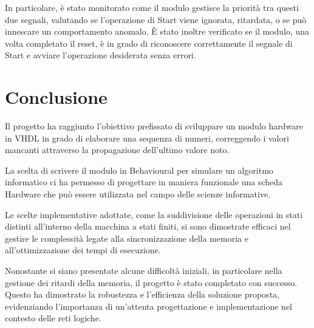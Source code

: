 \documentclass[12pt]{article}
\begin{document}
In particolare, è stato monitorato come il modulo gestisce la priorità tra questi due segnali, valutando se l'operazione di Start viene ignorata, ritardata, o se può innescare un comportamento anomalo. È stato inoltre verificato se il modulo, una volta completato il reset, è in grado di riconoscere correttamente il segnale di Start e avviare l'operazione desiderata senza errori. 

\newpage
\section{Conclusione}
Il progetto ha raggiunto l'obiettivo prefissato di sviluppare un modulo hardware in VHDL in grado di elaborare una sequenza di numeri, correggendo i valori mancanti attraverso la propagazione dell'ultimo valore noto. 

La scelta di scrivere il modulo in Behavioural per simulare un algoritmo informatico ci ha permesso di progettare in maniera funzionale una scheda Hardware che può essere utilizzata nel campo delle scienze informative.

Le scelte implementative adottate, come la suddivisione delle operazioni in stati distinti all'interno della macchina a stati finiti, si sono dimostrate efficaci nel gestire le complessità legate alla sincronizzazione della memoria e all'ottimizzazione dei tempi di esecuzione.

Nonostante si siano presentate alcune difficoltà iniziali, in particolare nella gestione dei ritardi della memoria, il progetto è stato completato con successo. Questo ha dimostrato la robustezza e l'efficienza della soluzione proposta, evidenziando l'importanza di un'attenta progettazione e implementazione nel contesto delle reti logiche.

 
\end{document}
